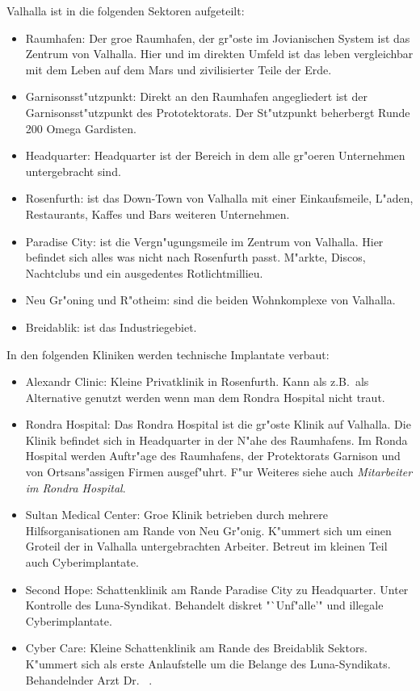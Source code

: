 
Valhalla ist in die folgenden Sektoren aufgeteilt:

\begin{itemize}
    \item Raumhafen: Der gro\3e Raumhafen, der gr"oste im Jovianischen System ist das Zentrum von Valhalla. Hier und im direkten Umfeld ist das leben vergleichbar mit dem Leben auf dem Mars und zivilisierter Teile der Erde.
    \item Garnisonsst"utzpunkt: Direkt an den Raumhafen angegliedert ist der Garnisonsst"utzpunkt des Prototektorats. Der St"utzpunkt beherbergt Runde 200 Omega Gardisten. 
    \item Headquarter: Headquarter ist der Bereich in dem alle gr"o\3eren Unternehmen untergebracht sind.
    \item Rosenfurth: ist das Down-Town  von Valhalla mit einer Einkaufsmeile, L"aden, Restaurants, Kaffes und Bars weiteren Unternehmen.
    \item Paradise City: ist die Vergn"ugungsmeile im Zentrum von Valhalla. Hier befindet sich alles was nicht nach Rosenfurth passt. M"arkte, Discos, Nachtclubs und ein ausgedentes Rotlichtmillieu.
    \item Neu Gr"oning und R"otheim: sind die beiden Wohnkomplexe von Valhalla.
    \item Breidablik: ist das Industriegebiet.
\end{itemize}



In den folgenden Kliniken werden technische Implantate verbaut:

\begin{itemize}
    \item Alexandr Clinic: Kleine Privatklinik in Rosenfurth. Kann als z.B.~als Alternative genutzt werden wenn man dem Rondra Hospital nicht traut.
    \item Rondra Hospital: Das Rondra Hospital ist die gr"os\3te Klinik auf Valhalla. Die Klinik befindet sich in Headquarter in der N"ahe des Raumhafens. Im Ronda Hospital werden Auftr"age des Raumhafens, der Protektorats Garnison und von Ortsans"assigen Firmen ausgef"uhrt. F"ur Weiteres siehe auch \emph{Mitarbeiter im Rondra Hospital}. 
    \item Sultan Medical Center: Gro\3e Klinik betrieben durch mehrere Hilfsorganisationen am Rande von Neu Gr"onig. K"ummert sich um einen Gro\3teil der in Valhalla untergebrachten Arbeiter. Betreut im kleinen Teil auch Cyberimplantate.
    \item Second Hope: Schattenklinik am Rande Paradise City zu Headquarter. Unter Kontrolle des Luna-Syndikat. Behandelt diskret "`Unf"alle'" und illegale Cyberimplantate.
    \item {} Cyber Care: Kleine Schattenklinik am Rande des Breidablik Sektors. K"ummert sich als erste Anlaufstelle um die Belange des Luna-Syndikats. Behandelnder Arzt Dr.~ .
\end{itemize}

